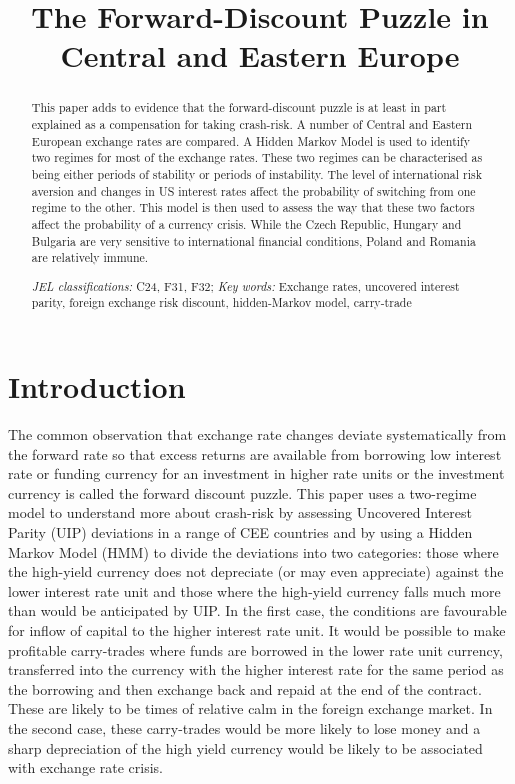 \documentclass[12pt, a4paper, oneside]{article}\usepackage[]{graphicx}\usepackage[]{color}
\begin{document}
\title{The Forward-Discount Puzzle in Central and Eastern Europe}

\maketitle
\begin{abstract}
This paper adds to evidence that the forward-discount puzzle is at least in part explained as a compensation for taking crash-risk. A number of Central and Eastern European exchange rates are compared. A Hidden Markov Model is used to identify two regimes for most of the exchange rates.  These two regimes can be characterised as being either periods of stability or periods of instability. The level of international risk aversion and changes in US interest rates affect the probability of switching from one regime to the other. This model is then used to assess the way that these two factors affect the probability of a currency crisis. While the Czech Republic,  Hungary and Bulgaria are very sensitive to international financial conditions, Poland and Romania are relatively immune.  

\emph{JEL classifications:} C24, F31, F32; 
\emph{Key words:} Exchange rates, uncovered interest parity, foreign exchange risk discount, hidden-Markov model, carry-trade


\end{abstract}

\section{Introduction}
The common observation that exchange rate changes deviate systematically from the forward rate so that excess returns are available from borrowing low interest rate or funding currency for an investment in higher rate units or the investment currency is called the forward discount puzzle.   This paper uses a two-regime model to understand more about crash-risk by assessing Uncovered Interest Parity (UIP) deviations in a range of CEE countries and by using a Hidden Markov Model (HMM) to divide the deviations into two categories: those where the high-yield currency does not depreciate (or may even appreciate) against the lower interest rate unit and those where the high-yield currency falls much more than would be anticipated by UIP.  In the first case, the conditions are favourable for inflow of capital to the higher interest rate unit.  It would be possible to make profitable carry-trades where funds are borrowed in the lower rate unit currency, transferred into the currency with the higher interest rate for the same period as the borrowing and then exchange back and repaid at the end of the contract. These are likely to be times of relative calm in the foreign exchange market. In the second case, these carry-trades would be more likely to lose money and a sharp depreciation of the high yield currency would be likely to be associated with exchange rate crisis. 
\end{document}
